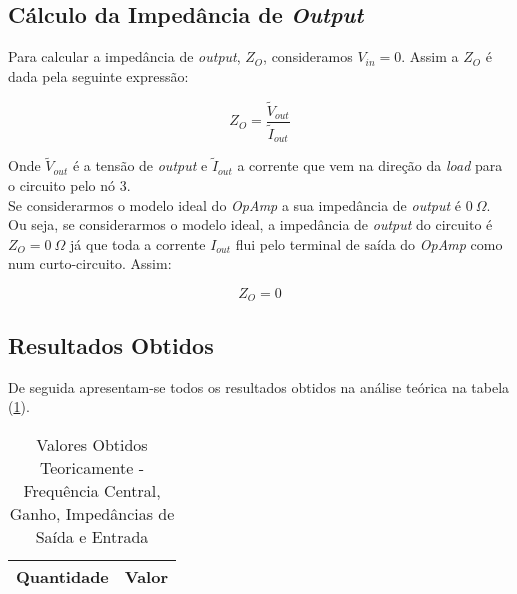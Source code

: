 \subsection{Cálculo da Impedância de \emph{Output}}

Para calcular a impedância de \emph{output}, $Z_O$, consideramos $V_{in} = 0$. Assim a $Z_O$ é dada pela seguinte expressão:

\begin{equation}
    Z_O = \frac{\widetilde{V}_{out}}{\widetilde{I}_{out}}
\end{equation}

Onde $\widetilde{V}_{out}$ é a tensão de \emph{output} e $\widetilde{I}_{out}$ a corrente que vem na direção da \emph{load} para o circuito pelo nó 3.
\\
Se considerarmos o modelo ideal do \emph{OpAmp} a sua impedância de \emph{output} é $0 \: \Omega$. Ou seja, se considerarmos o modelo ideal,
a impedância de \emph{output} do circuito é $Z_O = 0 \: \Omega$ já que toda a corrente $I_{out}$ flui pelo terminal de saída do \emph{OpAmp} como num
curto-circuito. Assim:

\begin{equation}
    Z_O = 0
    \label{eq:ImpedanciaOutput}
\end{equation}

\subsection{Resultados Obtidos}

De seguida apresentam-se todos os resultados obtidos na análise teórica na tabela (\ref{tab:Teo}).

\begin{table}[H]
    \centering
    \begin{tabular}{|l|r|}
    \hline    
    {\bf Quantidade} & {\bf Valor} \\ \hline
    
    \end{tabular}
    \caption{Valores Obtidos Teoricamente - Frequência Central, Ganho, Impedâncias de Saída e Entrada}
    \label{tab:Teo}
\end{table}

